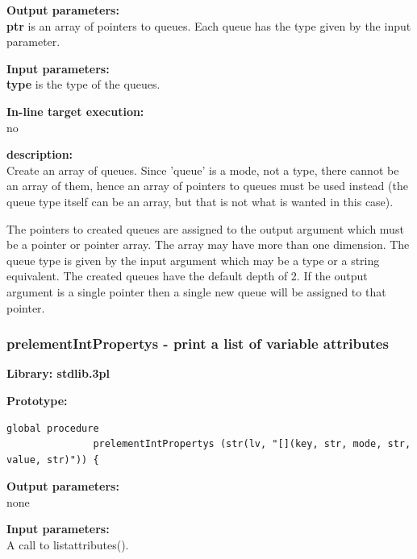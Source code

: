             {\bf Output parameters:} \\
            {\bf ptr} is an array of pointers to queues. Each
            queue has the type given by the input parameter.

            {\bf Input parameters:} \\            
            {\bf type} is the type of the queues.
        
            {\bf In-line target execution:} \\
            no

            {\bf description:} \\
            Create an array of queues. Since 'queue' is a mode, not a type,
            there cannot be an array of them, hence an array of pointers to
            queues must be used instead (the queue type itself can be an
            array, but that is not what is wanted in this case).
            
            The pointers to created queues are assigned to the output
            argument which must be a pointer or pointer array. The array may
            have more than one dimension. The queue type is given by the input
            argument which may be a type or a string equivalent. The created
            queues have the default depth of 2. If the output argument is a
            single pointer then a single new queue will be assigned to that
            pointer.



        \subsubsection{prelementIntPropertys - print a list of variable attributes}\label{sec:lpprintattrs}

            {\bf Library: stdlib.3pl}

            {\bf Prototype:} \\
            \vsp
            \begin{lstlisting}[gobble=12, language=threepl]
               global procedure
               prelementIntPropertys (str(lv, "[](key, str, mode, str, value, str)")) {
            \end{lstlisting}

            {\bf Output parameters:} \\
            none

            {\bf Input parameters:} \\            
            A call to listattributes().
        
